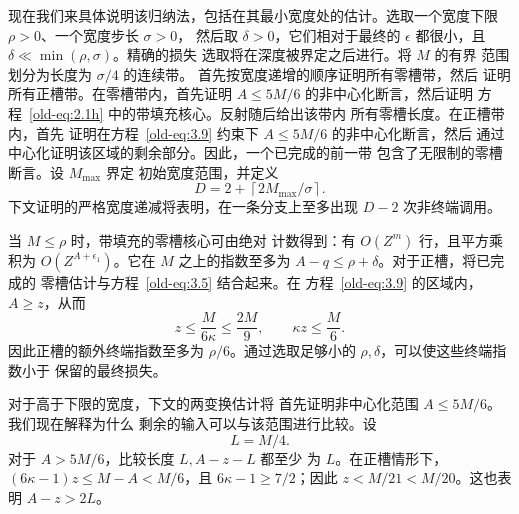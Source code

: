 现在我们来具体说明该归纳法，包括在其最小宽度处的估计。选取一个宽度下限 \(\rho>0\)、一个宽度步长 \(\sigma>0\)，
然后取 \(\delta>0\)，它们相对于最终的
\(\epsilon\) 都很小，且 \(\delta\ll\min(\rho,\sigma)\)。精确的损失
选取将在深度被界定之后进行。将 \(M\) 的有界
范围划分为长度为 \(\sigma/4\) 的连续带。
首先按宽度递增的顺序证明所有零槽带，然后
证明所有正槽带。在零槽带内，首先证明
\(A\le5M/6\) 的非中心化断言，然后证明
方程~\eqref{old-eq:2.1h} 中的带填充核心。反射随后给出该带内
所有零槽长度。在正槽带内，首先
证明在方程~\eqref{old-eq:3.9} 约束下
\(A\le5M/6\) 的非中心化断言，然后
通过中心化证明该区域的剩余部分。因此，一个已完成的前一带
包含了无限制的零槽断言。设 \(M_{\max}\) 界定
初始宽度范围，并定义
\[
 D=2+\left\lceil 2M_{\max}/\sigma\right\rceil.
\]
下文证明的严格宽度递减将表明，在一条分支上至多出现 \(D-2\)
次非终端调用。

当 \(M\le\rho\) 时，带填充的零槽核心可由绝对
计数得到：有 \(O(Z^m)\) 行，且平方乘积为
\(O(Z^{A+\epsilon_1})\)。它在 \(M\) 之上的指数至多为
\(A-q\le\rho+\delta\)。对于正槽，将已完成的
零槽估计与方程~\eqref{old-eq:3.5} 结合起来。在
方程~\eqref{old-eq:3.9} 的区域内，\(A\ge z\)，从而
\begin{equation}
 z\le\frac{M}{6\kappa}\le\frac{2M}{9},
 \qquad \kappa z\le\frac M6.
 \label{old-eq:3.6}
\end{equation}
因此正槽的额外终端指数至多为
\(\rho/6\)。通过选取足够小的 \(\rho,\delta\)，可以使这些终端指数小于
保留的最终损失。

对于高于下限的宽度，下文的两变换估计将
首先证明非中心化范围 \(A\le5M/6\)。我们现在解释为什么
剩余的输入可以与该范围进行比较。设
\begin{equation}
 L=M/4.
 \label{old-eq:2.2}
\end{equation}
对于 \(A>5M/6\)，比较长度 \(L,A-z-L\) 都至少
为 \(L\)。在正槽情形下，
\((6\kappa-1)z\le M-A<M/6\)，且 \(6\kappa-1\ge7/2\)；因此
\(z<M/21<M/20\)。这也表明 \(A-z>2L\)。

